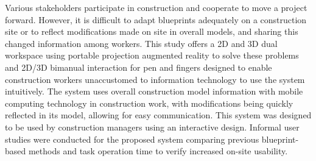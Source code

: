 \begin{comment}
In the construction process, various stakeholders attend and cooperate with each other to move the project forward. However, it is currently difficult for architects' blueprints to be sufficiently adapted on a construction site, and there are many problems that have not been considered. It is also difficult to reflect modifications made on-site in overall models, and the difficulty in sharing this changed information between workers can be a problem. This system construction may be too complicated to be used on-site or 3D model information may not be offered, and since input technology is complicated, it is difficult to reflect this work information on-site. This study offers a 2D and 3D Dual Workspace using portable Projection AR to solve these problems, and 2D/3D Bimanual Interaction for pen and fingers was designed so that construction workers unused to IT can intuitively use the system. The system makes convenient use of overall construction model information using mobile computing technology within construction work, and modifications are quickly reflected in its model. Through this, it allows for easy communication. This system was designed to use interaction. It is designed for use by construction managers using an interactive design. Informal user studies were carried out for the proposed system comparing previous blueprint-based methods and task operation time to verify increased on-site usability. 
\end{comment}
Various stakeholders participate in construction and cooperate to move a project forward. However, it is difficult to adapt blueprints adequately on a construction site or to reflect modifications made on site in overall models, and sharing this changed information among workers. This study offers a 2D and 3D dual workspace using portable projection augmented reality to solve these problems and 2D/3D bimanual interaction for pen and fingers designed to enable construction workers unaccustomed to information technology to use the system intuitively. The system uses overall construction model information with mobile computing technology in construction work, with modifications being quickly reflected in its model, allowing for easy communication. This system was designed to be used by construction managers using an interactive design. Informal user studies were conducted for the proposed system comparing previous blueprint-based methods and task operation time to verify increased on-site usability.


